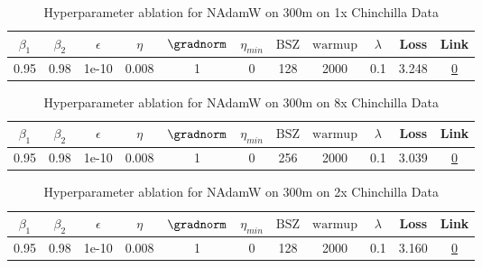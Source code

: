 \begin{table}[H]
\centering
\caption{Hyperparameter ablation for NAdamW on 300m on 1x Chinchilla Data}
\label{tab:ablation_nadamw_300m_1}
\begin{tabular}{ccccccccccc}
\toprule
$\beta_1$ & $\beta_2$ & $\epsilon$ & $\eta$ & $\gradnorm$ & $\eta_{min}$ & $\mathrm{BSZ}$ & $\mathrm{warmup}$ & $\lambda$ & Loss & Link \\
\midrule
0.95 & 0.98 & 1e-10 & 0.008 & 1 & 0 & 128 & 2000 & 0.1 & 3.248 & \href{https://wandb.ai/stanford-mercury/optimizer-scaling/runs/sweep-300m-6B-nadamwf15cf6lr0.008-wd0.1-minlr0-warmup2000-b10.95-28ca3a}{0} \\
\midrule
\bottomrule
\end{tabular}
\end{table}

\begin{table}[H]
\centering
\caption{Hyperparameter ablation for NAdamW on 300m on 8x Chinchilla Data}
\label{tab:ablation_nadamw_300m_8}
\begin{tabular}{ccccccccccc}
\toprule
$\beta_1$ & $\beta_2$ & $\epsilon$ & $\eta$ & $\gradnorm$ & $\eta_{min}$ & $\mathrm{BSZ}$ & $\mathrm{warmup}$ & $\lambda$ & Loss & Link \\
\midrule
0.95 & 0.98 & 1e-10 & 0.008 & 1 & 0 & 256 & 2000 & 0.1 & 3.039 & \href{https://wandb.ai/stanford-mercury/optimizer-scaling/runs/sweep-300m-48B-nadamw506173lr0.008-wd0.1-minlr0-warmup2000-b10.9-a344a3}{0} \\
\midrule
\bottomrule
\end{tabular}
\end{table}

\begin{table}[H]
\centering
\caption{Hyperparameter ablation for NAdamW on 300m on 2x Chinchilla Data}
\label{tab:ablation_nadamw_300m_2}
\begin{tabular}{ccccccccccc}
\toprule
$\beta_1$ & $\beta_2$ & $\epsilon$ & $\eta$ & $\gradnorm$ & $\eta_{min}$ & $\mathrm{BSZ}$ & $\mathrm{warmup}$ & $\lambda$ & Loss & Link \\
\midrule
0.95 & 0.98 & 1e-10 & 0.008 & 1 & 0 & 128 & 2000 & 0.1 & 3.160 & \href{https://wandb.ai/stanford-mercury/optimizer-scaling/runs/sweep-300m-12B-nadamwd89df2lr0.008-wd0.1-minlr0-warmup2000-b10.9-07cb43}{0} \\
\midrule
\bottomrule
\end{tabular}
\end{table}

